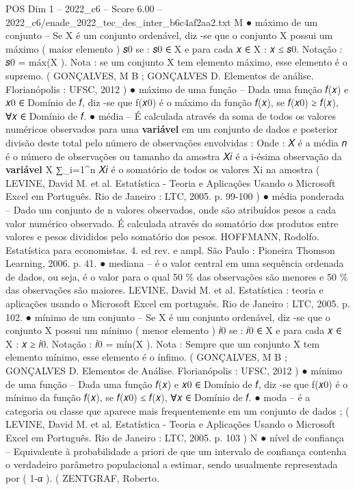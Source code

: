 \begin{textsample}{POS Dim 1 – 2022\_c6 – Score 6.00 – 2022\_c6/enade\_2022\_tec\_des\_inter\_b6c4af2aa2.txt}
M {\EmojiFont ●} máximo de um conjunto – Se X é um conjunto ordenável, diz -se que o conjunto X possui um máximo ( maior elemento ) 𝑠0 se : 𝑠0 ∈ X e para cada 𝑥 ∈ X : 𝑥 ≤ 𝑠0.
Notação : 𝑠0 = máx(X ).
Nota : se um conjunto X tem elemento máximo, esse elemento é o supremo. ( GONÇALVES, M B ; GONÇALVES D.
Elementos de análise.
Florianópolis : UFSC, 2012 ) {\EmojiFont ●} máximo de uma função – Dada uma função 𝑓(𝑥) e 𝑥0 ∈ Domínio de 𝑓, diz -se que f(𝑥0) é o máximo da função 𝑓(𝑥), se 𝑓(𝑥0) ≥ 𝑓(𝑥), ∀𝑥 ∈ Domínio de 𝑓. {\EmojiFont ●} média – É calculada através da soma de todos os valores numéricos observados para uma \textbf{variável} em um conjunto de dados e posterior divisão deste total pelo número de observações envolvidas : Onde : 𝑋 é a média 𝑛 é o número de observações ou tamanho da amostra 𝑋𝑖 é a i-ésima observação da \textbf{variável} X ∑\_i=1\textasciicircum{}n 𝑋𝑖 é o somatório de todos os valores Xi na amostra ( LEVINE, David M. et al.
Estatística - Teoria e Aplicações Usando o Microsoft Excel em Português.
Rio de Janeiro : LTC, 2005. p. 99-100 ) {\EmojiFont ●} média ponderada – Dado um conjunto de n valores observados, onde são atribuídos pesos a cada valor numérico observado.
É calculada através do somatório dos produtos entre valores e pesos divididos pelo somatório dos pesos.
HOFFMANN, Rodolfo.
Estatística para economistas. 4. ed rev. e ampl.
São Paulo : Pioneira Thomson Learning, 2006. p. 41. {\EmojiFont ●} mediana – é o valor central em uma sequência ordenada de dados, ou seja, é o valor para o qual 50 \% das observações são menores e 50 \% das observações são maiores.
LEVINE, David M. et al.
Estatística : teoria e aplicações usando o Microsoft Excel em português.
Rio de Janeiro : LTC, 2005. p. 102. {\EmojiFont ●} mínimo de um conjunto – Se X é um conjunto ordenável, diz -se que o conjunto X possui um mínimo ( menor elemento ) 𝑖0 se : 𝑖0 ∈ X e para cada 𝑥 ∈ X : 𝑥 ≥ 𝑖0.
Notação : 𝑖0 = mín(X ).
Nota : Sempre que um conjunto X tem elemento mínimo, esse elemento é o ínfimo. ( GONÇALVES, M B ; GONÇALVES D.
Elementos de Análise.
Florianópolis : UFSC, 2012 ) {\EmojiFont ●} mínimo de uma função – Dada uma função 𝑓(𝑥) e 𝑥0 ∈ Domínio de 𝑓, diz -se que f(𝑥0) é o mínimo da função 𝑓(𝑥), se 𝑓(𝑥0) ≤ 𝑓(𝑥), ∀𝑥 ∈ Domínio de 𝑓. {\EmojiFont ●} moda – é a categoria ou classe que aparece mais frequentemente em um conjunto de dados ; ( LEVINE, David M. et al.
Estatística - Teoria e Aplicações Usando o Microsoft Excel em Português.
Rio de Janeiro : LTC, 2005. p. 103 ) N {\EmojiFont ●} nível de confiança – Equivalente à probabilidade a priori de que um intervalo de confiança contenha o verdadeiro parâmetro populacional a estimar, sendo usualmente representada por ( 1-α ). ( ZENTGRAF, Roberto.

\end{textsample}
